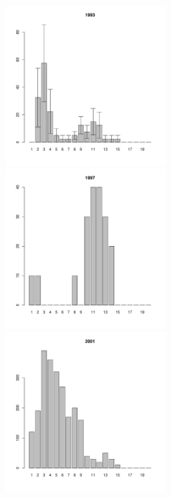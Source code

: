 \begin{figure}[h]
\begin{multicols}{3}
\hfill
\includegraphics[width=60mm]{../White_Sea/Luvenga_Goreliy/midlow_1993_.pdf}
\hfill
\includegraphics[width=60mm]{../White_Sea/Luvenga_Goreliy/midlow_1997_.pdf}
\hfill
\includegraphics[width=60mm]{../White_Sea/Luvenga_Goreliy/midlow_2001_.pdf}
\end{multicols}



\end{figure}
